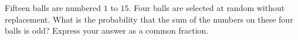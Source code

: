 Fifteen balls are numbered $1$ to $15$. Four balls are selected at random without replacement. What is the probability that the sum of the numbers on these four balls is odd? Express your answer as a common fraction.
